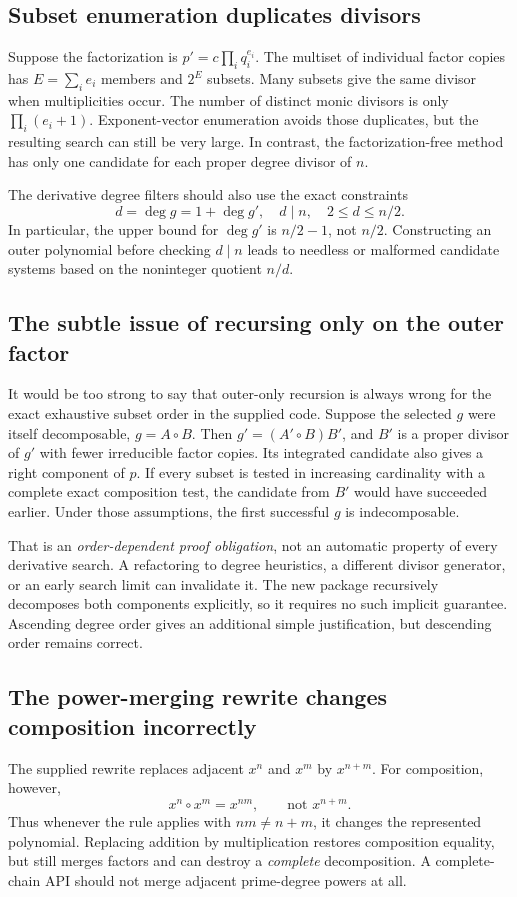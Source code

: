\documentclass[11pt,letterpaper]{article}
\theoremstyle{definition}
\theoremstyle{remark}
\begin{document}
\subsection{Subset enumeration duplicates divisors}
Suppose the factorization is $p'=c\prod_i q_i^{e_i}$. The multiset of
individual factor copies has $E=\sum_i e_i$ members and $2^E$ subsets.
Many subsets give the same divisor when multiplicities occur. The number
of distinct monic divisors is only $\prod_i(e_i+1)$.
Exponent-vector enumeration avoids those duplicates, but the resulting
search can still be very large. In contrast, the factorization-free
method has only one candidate for each proper degree divisor of $n$.

The derivative degree filters should also use the exact constraints
\[
 d=\deg g=1+\deg g',\quad d\mid n,\quad 2\leq d\leq n/2.
\]
In particular, the upper bound for $\deg g'$ is $n/2-1$, not $n/2$.
Constructing an outer polynomial before checking $d\mid n$ leads to
needless or malformed candidate systems based on the noninteger quotient
$n/d$.

\subsection{The subtle issue of recursing only on the outer factor}
It would be too strong to say that outer-only recursion is always wrong
for the exact exhaustive subset order in the supplied code. Suppose the
selected $g$ were itself decomposable, $g=A\circ B$. Then
$g'=(A'\circ B)B'$, and $B'$ is a proper divisor of $g'$ with fewer
irreducible factor copies. Its integrated candidate also gives a right
component of $p$. If every subset is tested in increasing cardinality
with a complete exact composition test, the candidate from $B'$ would
have succeeded earlier. Under those assumptions, the first successful
$g$ is indecomposable.

That is an \emph{order-dependent proof obligation}, not an automatic
property of every derivative search. A refactoring to degree heuristics,
a different divisor generator, or an early search limit can invalidate
it. The new package recursively decomposes both components explicitly,
so it requires no such implicit guarantee. Ascending degree order gives
an additional simple justification, but descending order remains correct.

\subsection{The power-merging rewrite changes composition incorrectly}
The supplied rewrite replaces adjacent $x^n$ and $x^m$ by $x^{n+m}$.
For composition, however,
\[
 x^n\circ x^m=x^{nm},\qquad\text{not }x^{n+m}.
\]
Thus whenever the rule applies with $nm\ne n+m$, it changes the
represented polynomial. Replacing addition by multiplication restores
composition equality, but still merges factors and can destroy a
\emph{complete} decomposition. A complete-chain API should not merge
adjacent prime-degree powers at all.
\end{document}
